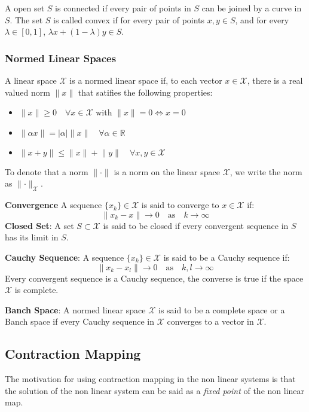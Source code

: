 A open set \(S\) is connected if every pair of points in \(S\) can be joined by a curve in \(S\). The
set \(S\) is called convex if for every pair of points \(x, y \in S\), and for every \(\lambda \in [0,1]\),
\(\lambda x + (1 - \lambda) y \in S\).

\subsubsection{Normed Linear Spaces}
A linear space \(\mathcal{X} \) is a normed linear space if, to each vector \(x \in \mathcal{X}\),
there is a real valued norm \(\lVert x \rVert \) that satifies the following properties:
\begin{itemize}
    \item \(\lVert x \rVert \geq 0 \quad \forall x \in \mathcal{X}\) with \(\lVert x \rVert = 0 \iff x = 0\)
    \item \(\lVert \alpha x \rVert = \lvert \alpha \rvert \lVert x \rVert \quad \forall \alpha \in \mathbb{R}\)
    \item \(\lVert x + y \rVert \leq \lVert x \rVert + \lVert y \rVert \quad \forall x, y \in \mathcal{X}\)
\end{itemize}
To denote that a norm \(\lVert \cdot \rVert \) is a norm on the linear space \(\mathcal{X}\), we write
the norm as \(\lVert \cdot \rVert_\mathcal{X} \).

\textbf{Convergence} A sequence \(\{x_k\} \in \mathcal{X} \) is said to converge to \(x \in \mathcal{X}\)
if:
\[
    \lVert x_k - x \rVert \to 0 \quad \text{as} \quad k \to \infty
\]
\textbf{Closed Set}: A set \(S \subset \mathcal{X}\) is said to be closed if every convergent sequence
in \(S\) has its limit in \(S\).

\textbf{Cauchy Sequence}: A sequence \(\{x_k\} \in \mathcal{X}\) is said to be a Cauchy sequence if:
\[
    \lVert x_k - x_l \rVert \to 0 \quad \text{as} \quad k, l \to \infty
\]
Every convergent sequence is a Cauchy sequence, the converse is true if the space \(\mathcal{X}\) is
complete.

\textbf{Banch Space}: A normed linear space \(\mathcal{X}\) is said to be a complete space or a Banch space
if every Cauchy sequence in \(\mathcal{X}\) converges to a vector in \(\mathcal{X}\).

\subsection{Contraction Mapping}
The motivation for using contraction mapping in the non linear systems is that the solution of 
the non linear system can be said as a \emph{fixed point} of the non linear map.

